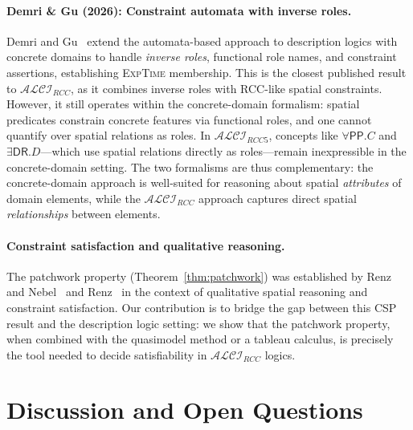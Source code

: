 \documentclass[a4paper,11pt]{article}
\theoremstyle{definition}
\newcommand{\ALCIRCC}[1]{\ensuremath{\mathcal{ALCI}_{\mathit{RCC#1}}}}
\newcommand{\DR}{\ensuremath{\mathsf{DR}}}
\newcommand{\PP}{\ensuremath{\mathsf{PP}}}
\newcommand{\EXPTIME}{\textsc{ExpTime}}
\begin{document}
\paragraph{Demri \& Gu (2026): Constraint automata with inverse roles.}
Demri and Gu~\cite{DemriGu2026} extend the automata-based approach to
description logics with concrete domains to handle \emph{inverse
roles}, functional role names, and constraint assertions, establishing
\EXPTIME{} membership.  This is the closest published result to
$\ALCIRCC{}$, as it combines inverse roles with RCC-like spatial
constraints.  However, it still operates within the concrete-domain
formalism: spatial predicates constrain concrete features via
functional roles, and one cannot quantify over spatial relations as
roles.  In $\ALCIRCC{5}$, concepts like $\forall\PP.C$ and
$\exists\DR.D$---which use spatial relations directly as
roles---remain inexpressible in the concrete-domain setting.  The two
formalisms are thus complementary: the concrete-domain approach is
well-suited for reasoning about spatial \emph{attributes} of domain
elements, while the $\ALCIRCC{}$ approach captures direct spatial
\emph{relationships} between elements.

\paragraph{Constraint satisfaction and qualitative reasoning.}
The patchwork property (Theorem~\ref{thm:patchwork}) was established
by Renz and Nebel~\cite{RenzNebel1999} and
Renz~\cite{Renz1999} in the context of qualitative spatial reasoning
and constraint satisfaction.  Our contribution is to bridge the gap
between this CSP result and the description logic setting: we show
that the patchwork property, when combined with the quasimodel method
or a tableau calculus, is precisely the tool needed to decide
satisfiability in $\ALCIRCC{}$ logics.

\section{Discussion and Open Questions}
\label{sec:discussion}
\end{document}

